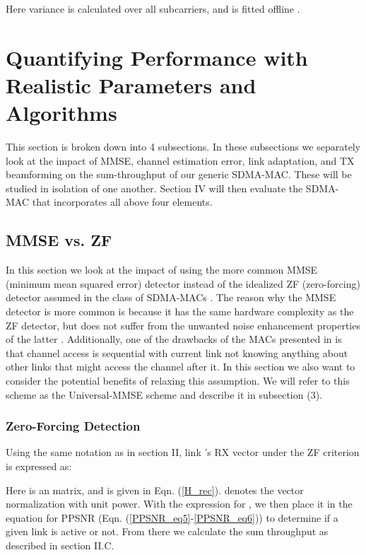 \documentclass[journal, final]{IEEEtran}
\begin{document}
Here variance  is calculated over all subcarriers, and  is fitted offline \cite{8_PER_model_1}.




\section{Quantifying Performance with Realistic Parameters and Algorithms}

This section is broken down into 4 subsections. In these subsections we separately look at the impact of MMSE, channel estimation error, link
adaptation, and TX beamforming on the sum-throughput of our generic SDMA-MAC. These will be studied in isolation of
one another. Section IV will then evaluate the
SDMA-MAC that incorporates all above four elements.

\subsection{MMSE vs. ZF}

In this section we look at the impact of using the more common MMSE (minimum
mean squared error) detector instead of the idealized ZF (zero-forcing) detector
assumed in the class of SDMA-MACs \cite{1_SPACEMAC, 2_MIMOMAN, 3_NULLHOC, 4_nullhoc}. The reason why the MMSE detector is
more common is because it has the same hardware complexity as the
ZF detector, but does not suffer from the unwanted noise
enhancement properties of the latter \cite{9_ZF_MMSE}. Additionally, one of the drawbacks of the MACs presented in \cite{1_SPACEMAC, 2_MIMOMAN, 3_NULLHOC, 4_nullhoc} is that channel access is sequential with current link not knowing anything about other links that might access the channel after it. In this section we also want to consider the potential benefits of relaxing this assumption. We will refer to this scheme as the Universal-MMSE scheme and describe it in subsection (3).

\subsubsection{Zero-Forcing Detection}

Using the same notation as in section II, link 's RX vector under the
ZF criterion is expressed as:

Here  is an  matrix, and  is given in Eqn. (\ref{H_rec}).  denotes the vector normalization with unit power. With the
expression for , we then place it in the
equation for PPSNR (Eqn. (\ref{PPSNR_eq5}-\ref{PPSNR_eq6})) to determine if a given link is active or
not. From there we calculate the sum throughput as described in section II.C.
\end{document}
